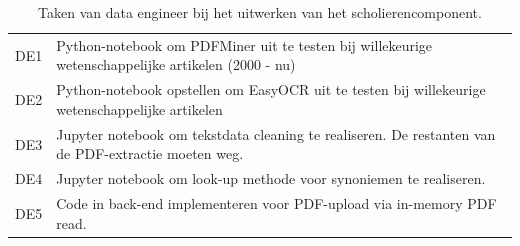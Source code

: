 \begin{center}
	\begin{table}[H]
		\begin{tabular}{|m{2cm}|m{12cm}|}
			\hline
			DE1	& Python-notebook om PDFMiner uit te testen bij willekeurige wetenschappelijke artikelen (2000 - nu) \\
			DE2 & Python-notebook opstellen om EasyOCR uit te testen bij willekeurige wetenschappelijke artikelen \\
			DE3 & Jupyter notebook om tekstdata cleaning te realiseren. De restanten van de PDF-extractie moeten weg. \\
			DE4 & Jupyter notebook om look-up methode voor synoniemen te realiseren. \\
			DE5 & Code in back-end implementeren voor PDF-upload via in-memory PDF read. \\
			\hline
		\end{tabular}
		\caption{Taken van data engineer bij het uitwerken van het scholierencomponent.}
		\label{table:tasks-data-engineer-scholars}
	\end{table}
\end{center}